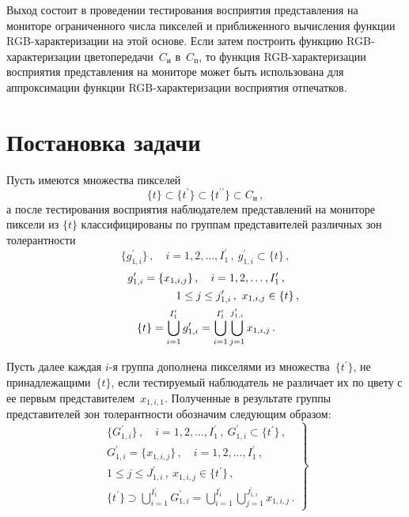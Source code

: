 \begin{multicols}{2}
  Выход состоит в проведении тестирования восприятия представления на 
мониторе ограниченного числа пикселей и приближенного вычисления 
функции RGB-ха\-рак\-те\-ри\-за\-ции на этой основе. Если затем построить 
функцию RGB-ха\-рак\-те\-ри\-за\-ции цветопередачи~$C_{\mathrm{и}}$ 
в~$C_{\mathrm{п}}$, то функция RGB-ха\-рак\-те\-ри\-за\-ции восприятия 
представления на мониторе может быть использована для аппроксимации 
функции RGB-ха\-рак\-те\-ри\-за\-ции восприятия отпечатков.

\section{Постановка задачи}

  Пусть имеются множества пикселей
  $$
  \{t\} \subset \{t^\prime\}\subset \{t^{\prime\prime}\}\subset C_{\mathrm{и}}\,,
  $$
а после тестирования восприятия наблюдателем представлений на мониторе 
пиксели из $\{t\}$ классифицированы по группам представителей различных 
зон толерантности
\begin{equation*}
\{g^\prime_{1,i}\}\,, \quad i=1, 2, \ldots , I^\prime_1\,,\ g^\prime_{1,i}\subset 
\{t\}\,,
\end{equation*}
\begin{gather*}
g^\prime_{1,i}=\{x_{1,i,j}\}\,,\quad i=1, 2, \ldots , I^\prime_1\,,\\
\hspace*{20mm} 1\leq j\leq 
j^\prime_{1,i}\,, \ x_{1,i,j}\in \{t\}\,,\\
\{t\} = \bigcup\limits_{i=1}^{I^\prime_1}  
g^\prime_{1,i}=\bigcup\limits_{i=1}^{I^\prime_1}\bigcup\limits_{j=1}^{j^\prime_{1,i}} 
x_{1,i,j}\,.
\end{gather*}
  
  Пусть далее каждая $i$-я группа дополнена пикселями из 
множества~$\{t^\prime\}$, не принадлежащими~$\{t\}$, если тестируемый 
наблюдатель не различает их по цвету с ее первым представителем~$x_{1,i,1}$. 
Полученные в результате группы представителей зон толерантности обозначим 
следующим образом:
  \begin{equation}
  \left.
  \begin{array}{c}
\{G^\prime_{1,i}\}\,, \quad i=1, 2, \ldots , I^\prime_1\,,\ G^\prime_{1,i}\subset 
\{t^\prime\}\,,\\[6pt]
G^\prime_{1,i}=\{x_{1,i,j}\}\,,\quad i=1, 2, \ldots , I^\prime_1\,,\\[6pt]
1\leq j\leq 
J^\prime_{1,i}\,, \ x_{1,i,j}\in \{t^\prime\}\,,\\[6pt]
\{t^\prime\} \supset \bigcup\limits_{i=1}^{I^\prime_1}  
G^\prime_{1,i}=\bigcup\limits_{i=1}^{I^\prime_1}\bigcup\limits_{j=1}^{J^\prime_{1,i}} 
x_{1,i,j}\,.
\end{array}
\right \}
\label{e1ar}
\end{equation}
  

\end{multicols}
